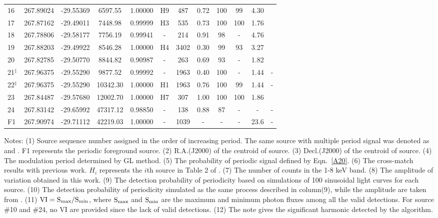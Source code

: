 \documentclass[fleqn,usenatbib]{mnras}
\begin{document}
\begin{table}
\begin{threeparttable}
\begin{tabular}{lccccccccccc}
\\
16 & 267.89024 &	 -29.55369 & 6597.55 & 1.00000 & H9 & 487 & 0.72  & 100  & 99 & 4.30 & \text{Second}
\\
17 & 267.87162 &	 -29.49011 & 7448.98 & 0.99999 & H3 & 535 & 0.73  & 100  & 100 & 1.76 & \text{Second}
\\
18 & 267.78806 &	 -29.58177 & 7756.19 & 0.99941 &-& 214 & 0.91 & 98 &-& 4.76 &\text{Second}
\\
19 & 267.88203 &	 -29.49922 & 8546.28 & 1.00000 &H4 & 3402 & 0.30  & 99 & 93 & 3.27 & \text{Second}
\\
20 & 267.82785 &	 -29.50770 & 8844.82 & 0.90987 &-& 263 & 0.69 
	& 93 &-& 1.82 & \text{Second}
\\
21$^\ddag$ & 267.96375 & -29.55290 & 9877.52 & 0.99992 & - & 1963 & 0.40 & 100 &-& 1.44&- 
\\
22$^\ddag$ & 267.96375 & -29.55290 & 10342.30 & 1.00000 & H1 & 1963 & 0.76 & 100 & 99 & 1.44 &-
\\
23 & 267.84487 &	 -29.57680 & 12002.70 & 1.00000 & H7 & 307 & 1.00 & 100  & 100 & 1.86 & \text{Second}
\\
24 & 267.83142 &	 -29.65992 & 47317.12 & 0.98850 &- & 138 & 0.88 
	& 87 &-&- &-
\\
\hline
F1 & 267.90974 &	-29.71112 & 42219.03 & 1.00000 & - &1039&-  &-&-&23.6&-
\\
\hline
\end{tabular}
\begin{tablenotes}
      \small
      \item 
      Notes:
      (1) Source sequence number assigned in the order of increasing period. The same source with multiple period signal was denoted as \dag and \ddag. F1 represents the periodic foreground source.
(2) R.A.(J2000) of the centroid of source. 
(3) Decl.(J2000) of the centroid of source. 
(4) The modulation period determined by GL method.
(5) The probability of periodic signal defined by Eqn.~\ref{A20}. 
(6) The cross-match results with previous work. $H_{i}$ represents the $i$th source in Table 2 of \cite{2012ApJ...746..165H}. 
(7) The number of counts in the 1-8 keV band. 
(8) The amplitude of variation obtained in this work. 
(9) The detection probability of periodicity based on simulations of 100 sinusoidal light curves for each source.
(10) The detection probability of periodicity simulated as the same process described in column(9), while the amplitude are taken from \cite{2012ApJ...746..165H}.
(11) $\rm VI=S_{max}/S_{min}$, where $\rm S_{max}$ and $\rm S_{min}$ are the maximum and minimum photon fluxes among all the valid detections. For source \#10 and \#24, no VI are provided since the lack of valid detections.
(12) The note gives the significant harmonic detected by the algorithm.
    \end{tablenotes}
\end{threeparttable}
\end{table}
\end{document}
